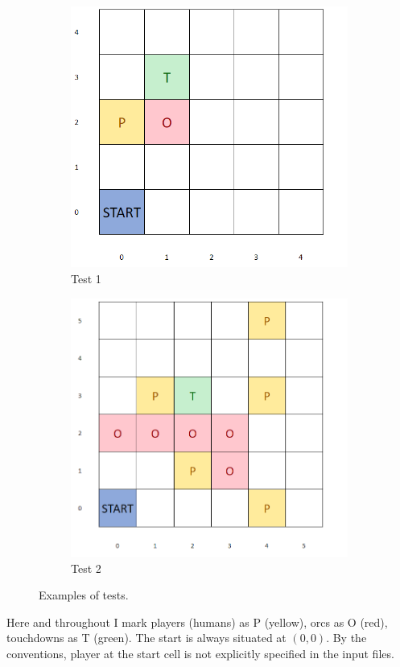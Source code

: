 \documentclass{article}
\begin{document}
\begin{figure}[ht]
   	 \centering
     \begin{subfigure}[b]{0.45\textwidth}
         \centering
         \includegraphics[width=\textwidth]{images/image1.png}
         \caption{Test 1}
         \label{fig:test1}
     \end{subfigure}
     \hfill
     \begin{subfigure}[b]{0.45\textwidth}
         \centering
         \includegraphics[width=\textwidth]{images/image2.png}
         \caption{Test 2}
         \label{fig:test2}
     \end{subfigure}
     \caption{Examples of tests.}
\end{figure}
Here and throughout I mark players (humans) as P (yellow), orcs as O (red), touchdowns as T (green). The start is always situated at $(0, 0)$. By the conventions, player at the start cell is not explicitly specified in the input files.
\end{document}
